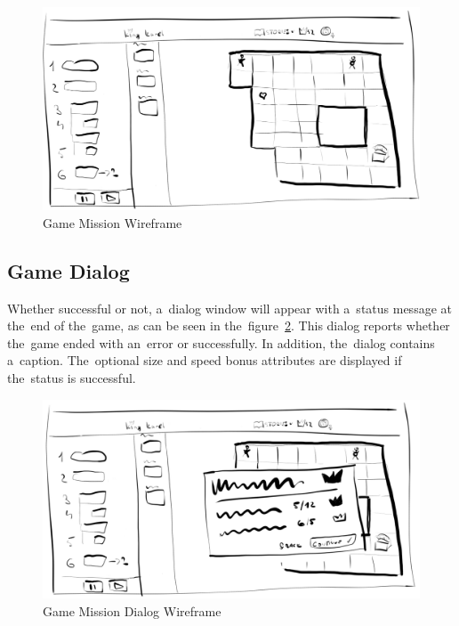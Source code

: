 \begin{figure}
    \centering
    \includegraphics[width=1\linewidth]{assets/design/ui/wir_game_mission.png}
    \caption{Game Mission Wireframe}
    \label{fig:design:wir:game-mission}
\end{figure}

\subsection{Game Dialog}

Whether successful or not, a~dialog window will appear with a~status message at the~end of the~game, as can be seen in the~figure~\ref{fig:design:wir:game-dialog}.
This dialog reports whether the~game ended with an~error or successfully.
In addition, the~dialog contains a~caption.
The~optional size and speed bonus attributes are displayed if the~status is successful.

\begin{figure}
    \centering
    \includegraphics[width=1\linewidth]{assets/design/ui/wir_game_dialog.png}
    \caption{Game Mission Dialog Wireframe}
    \label{fig:design:wir:game-dialog}
\end{figure}


